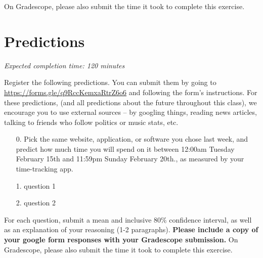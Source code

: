 \documentclass[11pt]{article}
\begin{document}
On Gradescope, please also submit the time it took to complete this exercise.

\section*{Predictions}

\emph{Expected completion time: 120 minutes}

Register the following predictions. You can submit them by going to \url{https://forms.gle/q9RccKemxaRtrZ6o6} and following the form's instructions. For these predictions, (and all predictions about the future throughout this class), we encourage you to use external sources -- by googling things, reading news articles, talking to friends who follow politics or music stats, etc.

\begin{enumerate}
	\item[0.] Pick the same website, application, or software you chose last week, and predict how much time you will spend on it between 12:00am Tuesday February 15th and 11:59pm Sunday February 20th., as measured by your time-tracking app.

	\item[1.] question 1

	\item[2.] question 2

\end{enumerate}

For each question, submit a mean and inclusive 80\% confidence interval, as well as an explanation of your reasoning (1-2 paragraphs). \textbf{Please include a copy of your google form responses with your Gradescope submission.} On Gradescope, please also submit the time it took to complete this exercise.
\end{document}
